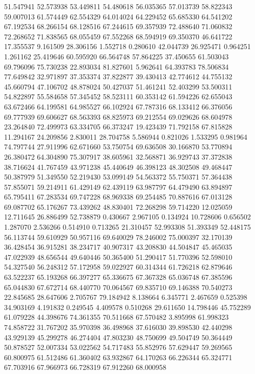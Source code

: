 51.547941
52.573938
53.449811
54.480618
56.035365
57.013739
58.822343
59.007013
61.574449
62.554329
64.014024
64.229452
65.685330
64.541202
67.192534
68.266154
68.128516
67.244615
69.357939
72.488640
71.060832
72.268652
71.838565
68.055459
67.552268
68.594919
69.350370
46.641722
17.355537
9.161509
28.306156
1.552718
0.280610
42.044739
26.925471
0.964251
1.261162
25.419646
60.595920
66.564748
57.864225
37.450655
61.503043
69.796096
75.730238
22.893034
81.827601
5.962641
64.393783
78.506834
77.649842
32.971897
37.353374
37.822877
39.430413
42.774612
44.755132
45.660794
47.106702
48.878024
50.427037
51.461241
52.403299
53.500311
54.822897
55.584658
57.345452
58.523111
60.353142
61.594226
62.655043
63.672466
64.199581
64.985527
66.102924
67.787316
68.133412
66.376056
69.777939
69.606627
68.563393
68.825973
69.212554
69.029626
68.604978
23.264840
72.499973
63.334705
66.373247
19.423439
71.792158
67.815828
11.294167
24.209856
2.830011
28.704758
5.586944
0.821026
1.533295
0.981964
74.797744
27.911996
62.671660
53.750754
69.636508
30.166870
53.770894
26.380472
64.304890
75.307917
38.605961
32.568871
36.929743
37.372838
38.716624
41.767459
43.971238
45.440649
46.398123
48.302508
49.468447
50.387979
51.349550
52.219430
53.099149
54.563372
55.750371
57.364438
57.855071
59.214911
61.429149
62.439119
63.987797
64.479490
63.894897
65.795411
67.283534
69.747228
68.969338
69.254485
70.887616
67.013128
69.087702
65.176267
73.439262
48.830401
72.268298
59.714220
12.025059
12.711645
26.886499
52.738879
0.430667
2.967105
0.134924
10.728606
0.656502
1.287070
2.536266
0.514910
0.713265
21.310457
52.993308
51.393349
52.448175
56.113744
59.610929
50.957116
69.640029
78.246002
75.000397
32.170139
36.428454
36.915281
38.234717
40.907317
43.208830
44.504847
45.465035
47.022939
48.656544
49.640446
50.365400
51.290417
51.770396
52.598010
54.327540
56.248312
57.172958
59.022927
60.314344
61.726218
62.879646
63.522237
65.193268
66.397277
65.336675
67.367328
65.036748
67.385596
65.044830
67.672714
68.440770
70.064567
69.835710
69.146388
70.540273
22.845685
28.647606
2.705767
79.184942
8.138664
6.345771
2.467659
0.525398
34.903169
4.191832
0.249545
4.409578
0.510268
29.611650
14.798446
45.752289
61.079228
44.398676
74.361355
70.511668
67.570482
3.895998
61.998323
74.858722
31.767202
35.970398
36.498968
37.616030
39.898530
42.440298
43.929139
45.299278
46.274404
47.803230
48.750699
49.504749
50.364449
50.878527
52.007334
53.022562
54.717483
55.852976
57.629447
59.269565
60.800975
61.512486
61.360402
63.932867
64.170263
66.226344
65.324771
67.703916
67.966973
66.728319
67.912260
68.000958
